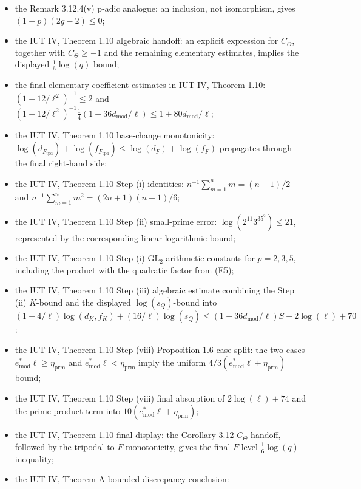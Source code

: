 \documentclass[11pt]{article}
\begin{document}
\begin{itemize}
  divides a gap log-volume by \(\ell\), and multiplication by \(\ell\) recovers it;
\item the Remark 3.12.4(v) p-adic analogue:
  an inclusion, not isomorphism, gives \((1-p)(2g-2)\le0\);
\item the IUT IV, Theorem 1.10 algebraic handoff: an explicit expression for
  \(C_\Theta\), together with \(C_\Theta\ge-1\) and the remaining elementary
  estimates, implies the displayed \(\frac16\log(q)\) bound;
\item the final elementary coefficient estimates in IUT IV, Theorem 1.10:
  \((1-12/\ell^2)^{-1}\le2\) and
  \((1-12/\ell^2)^{-1}\frac14(1+36d_{\mathrm{mod}}/\ell)
   \le 1+80d_{\mathrm{mod}}/\ell\);
\item the IUT IV, Theorem 1.10 base-change monotonicity:
  \(\log(d_{F_{\mathrm{tpd}}})+\log(f_{F_{\mathrm{tpd}}})
   \le \log(d_F)+\log(f_F)\) propagates through the final right-hand side;
\item the IUT IV, Theorem 1.10 Step (i) identities:
  \(n^{-1}\sum_{m=1}^n m=(n+1)/2\) and
  \(n^{-1}\sum_{m=1}^n m^2=(2n+1)(n+1)/6\);
\item the IUT IV, Theorem 1.10 Step (ii) small-prime error:
  \(\log(2^{11}3^35^2)\le21\), represented by the corresponding linear
  logarithmic bound;
\item the IUT IV, Theorem 1.10 Step (i) \(\mathrm{GL}_2\) arithmetic constants
  for \(p=2,3,5\), including the product with the quadratic factor from (E5);
\item the IUT IV, Theorem 1.10 Step (iii) algebraic estimate combining the
  Step (ii) \(K\)-bound and the displayed \(\log(s_Q)\)-bound into
  \((1+4/\ell)\log(d_K,f_K)+(16/\ell)\log(s_Q)
   \le (1+36d_{\mathrm{mod}}/\ell)S+2\log(\ell)+70\);
\item the IUT IV, Theorem 1.10 Step (viii) Proposition 1.6 case split:
  the two cases \(e^*_{\mathrm{mod}}\ell\ge\eta_{\mathrm{prm}}\) and
  \(e^*_{\mathrm{mod}}\ell<\eta_{\mathrm{prm}}\) imply the uniform
  \(4/3(e^*_{\mathrm{mod}}\ell+\eta_{\mathrm{prm}})\) bound;
\item the IUT IV, Theorem 1.10 Step (viii) final absorption of
  \(2\log(\ell)+74\) and the prime-product term into
  \(10(e^*_{\mathrm{mod}}\ell+\eta_{\mathrm{prm}})\);
\item the IUT IV, Theorem 1.10 final display:
  the Corollary 3.12 \(C_\Theta\) handoff, followed by the
  tripodal-to-\(F\) monotonicity, gives the final \(F\)-level
  \(\frac16\log(q)\) inequality;
\item the IUT IV, Theorem A bounded-discrepancy conclusion:

\end{itemize}
\end{document}
